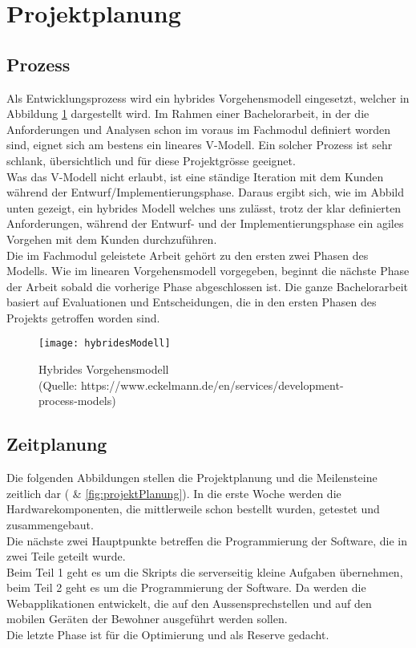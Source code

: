 \section{Projektplanung}
\label{sec:chapterexample}

\subsection{Prozess}
\label{sec:chapterexample}
Als Entwicklungsprozess wird ein hybrides Vorgehensmodell eingesetzt, welcher in Abbildung \ref{fig:hybridesModell} dargestellt wird. Im Rahmen einer Bachelorarbeit, in der die Anforderungen und Analysen schon im voraus im Fachmodul definiert worden sind, eignet sich am bestens ein lineares V-Modell. Ein solcher Prozess ist sehr schlank, übersichtlich und für diese Projektgrösse geeignet.
\\
Was das V-Modell nicht erlaubt, ist eine ständige Iteration mit dem Kunden während der Entwurf/Implementierungsphase. Daraus ergibt sich, wie im Abbild unten gezeigt, ein hybrides Modell welches uns zulässt, trotz der klar definierten Anforderungen, während der Entwurf- und der Implementierungsphase ein agiles Vorgehen mit dem Kunden durchzuführen.
\\
Die im Fachmodul geleistete Arbeit gehört zu den ersten zwei Phasen des Modells. Wie im linearen Vorgehensmodell vorgegeben, beginnt die nächste Phase der Arbeit sobald die vorherige Phase abgeschlossen ist. Die ganze Bachelorarbeit basiert auf Evaluationen und Entscheidungen, die in den ersten Phasen des Projekts getroffen worden sind. 

\begin{figure}[htb!]
	\begin{center}
		\texttt{[image: hybridesModell]}
		\caption[Hybrides Vorgehensmodell]{Hybrides Vorgehensmodell \\ (Quelle: https://www.eckelmann.de/en/services/development-process-models)}
		\label{fig:hybridesModell}
	\end{center}
\end{figure}


\subsection{Zeitplanung}
\label{sec:zeitplanung}
Die folgenden Abbildungen stellen die Projektplanung und die Meilensteine zeitlich dar ( \& \cref{fig:projektPlanung}). In die erste Woche werden die Hardwarekomponenten, die mittlerweile schon bestellt wurden, getestet und zusammengebaut. 
\\
Die nächste zwei Hauptpunkte betreffen die Programmierung der  Software, die in zwei Teile geteilt wurde.
\\ 
Beim Teil 1 geht es um die Skripts die serverseitig kleine Aufgaben übernehmen, beim Teil 2 geht es um die Programmierung der Software. Da werden die Webapplikationen entwickelt, die auf den Aussensprechstellen und auf den mobilen Geräten der Bewohner ausgeführt werden sollen.
\\
Die letzte Phase ist für die Optimierung und als Reserve gedacht.

